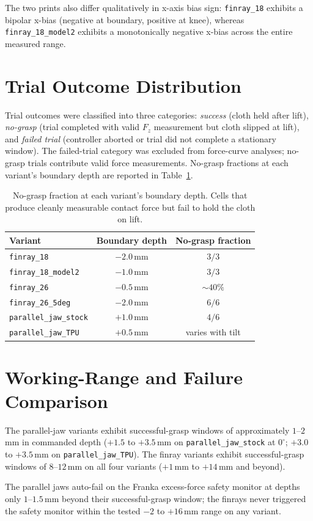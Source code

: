 The two prints also differ qualitatively in x-axis bias sign:
\texttt{finray\_18} exhibits a bipolar x-bias (negative at boundary,
positive at knee), whereas \texttt{finray\_18\_model2} exhibits a
monotonically negative x-bias across the entire measured range.

\section{Trial Outcome Distribution}
\label{sec:trial-outcomes}

Trial outcomes were classified into three categories: \emph{success}
(cloth held after lift), \emph{no-grasp} (trial completed with valid
$F_z$ measurement but cloth slipped at lift), and \emph{failed trial}
(controller aborted or trial did not complete a stationary window).
The failed-trial category was excluded from force-curve analyses;
no-grasp trials contribute valid force measurements. No-grasp fractions
at each variant's boundary depth are reported in
Table~\ref{tab:no-grasp-fraction}.

\begin{table}[ht]
\centering
\caption[No-grasp fractions at boundary]{No-grasp fraction at each
variant's boundary depth. Cells that produce cleanly measurable
contact force but fail to hold the cloth on lift.}
\label{tab:no-grasp-fraction}
\begin{tabular}{lcc}
\toprule
Variant & Boundary depth & No-grasp fraction \\
\midrule
\texttt{finray\_18}        & $-2.0$\,mm & $3/3$ \\
\texttt{finray\_18\_model2} & $-1.0$\,mm & $3/3$ \\
\texttt{finray\_26}        & $-0.5$\,mm & $\sim 40\%$ \\
\texttt{finray\_26\_5deg}  & $-2.0$\,mm & $6/6$ \\
\texttt{parallel\_jaw\_stock} & $+1.0$\,mm & $4/6$ \\
\texttt{parallel\_jaw\_TPU}   & $+0.5$\,mm & varies with tilt \\
\bottomrule
\end{tabular}
\end{table}

\section{Working-Range and Failure Comparison}
\label{sec:pj-vs-finray-results}

The parallel-jaw variants exhibit successful-grasp windows of
approximately $1$--$2$\,mm in commanded depth
($+1.5$ to $+3.5$\,mm on \texttt{parallel\_jaw\_stock} at $0^{\circ}$;
$+3.0$ to $+3.5$\,mm on \texttt{parallel\_jaw\_TPU}). The finray
variants exhibit successful-grasp windows of $8$--$12$\,mm on all four
variants ($+1$\,mm to $+14$\,mm and beyond).

The parallel jaws auto-fail on the Franka excess-force safety monitor
at depths only $1$--$1.5$\,mm beyond their successful-grasp window; the
finrays never triggered the safety monitor within the tested $-2$ to
$+16$\,mm range on any variant.
